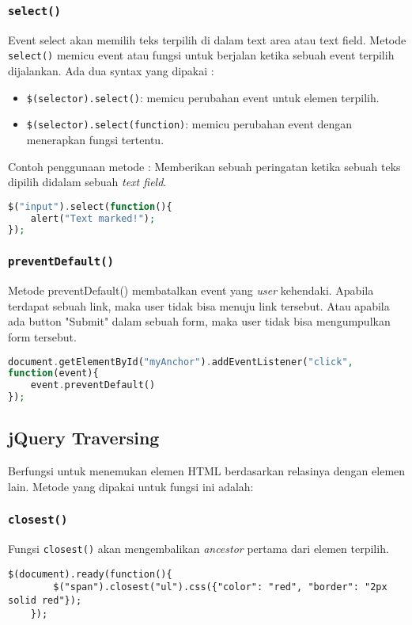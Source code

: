 \begin{itemize}
\subsubsection{\texttt{select()}}
Event select akan memilih teks terpilih di dalam text area atau text field.
Metode \texttt{select()} memicu event atau fungsi untuk berjalan ketika sebuah event terpilih dijalankan.
Ada dua syntax yang dipakai :
\begin{itemize}
	\item \texttt{\$(selector).select()}: memicu perubahan event untuk elemen terpilih.
	\item \texttt{\$(selector).select(function)}: memicu perubahan event dengan menerapkan fungsi tertentu.
\end{itemize}
Contoh penggunaan metode : Memberikan sebuah peringatan ketika sebuah teks dipilih didalam sebuah \textit{text field}.
\begin{lstlisting}[frame=single, language=PHP]
$("input").select(function(){
	alert("Text marked!");
});
\end{lstlisting}

\subsubsection{\texttt{preventDefault()}}
Metode preventDefault() membatalkan event yang \textit{user} kehendaki. Apabila terdapat sebuah link, maka user tidak bisa menuju link tersebut. Atau apabila ada button "Submit" dalam sebuah form, maka user tidak bisa mengumpulkan form tersebut.
\begin{lstlisting}[frame=single, language=PHP]
document.getElementById("myAnchor").addEventListener("click", 
function(event){
	event.preventDefault()
});
\end{lstlisting}


\subsection{jQuery Traversing}
Berfungsi untuk menemukan elemen HTML berdasarkan relasinya dengan elemen lain. Metode yang dipakai untuk fungsi ini adalah:
\subsubsection{\texttt{closest()}}
Fungsi \texttt{closest()} akan mengembalikan \textit{ancestor} pertama dari elemen terpilih.
\begin{lstlisting}[language=jquery]
	$(document).ready(function(){
		$("span").closest("ul").css({"color": "red", "border": "2px solid red"});
	});
\end{lstlisting}


\end{itemize}
